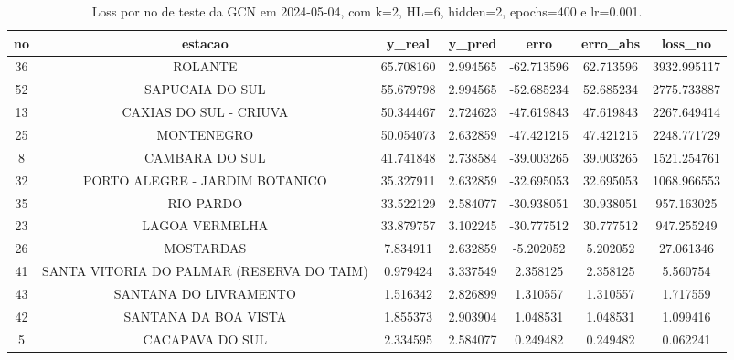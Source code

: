 \begin{table}[h]
\centering
\caption{Loss por no de teste da GCN em 2024-05-04, com k=2, HL=6, hidden=2, epochs=400 e lr=0.001.}
\label{tab:gcn_loss_k2_hl6_h2_e400_d20240504}
\begin{tabular}{ccccccc}
\toprule
no & estacao & y\_real & y\_pred & erro & erro\_abs & loss\_no \\
\midrule
36 & ROLANTE & 65.708160 & 2.994565 & -62.713596 & 62.713596 & 3932.995117 \\
52 & SAPUCAIA DO SUL & 55.679798 & 2.994565 & -52.685234 & 52.685234 & 2775.733887 \\
13 & CAXIAS DO SUL - CRIUVA & 50.344467 & 2.724623 & -47.619843 & 47.619843 & 2267.649414 \\
25 & MONTENEGRO & 50.054073 & 2.632859 & -47.421215 & 47.421215 & 2248.771729 \\
8 & CAMBARA DO SUL & 41.741848 & 2.738584 & -39.003265 & 39.003265 & 1521.254761 \\
32 & PORTO ALEGRE - JARDIM BOTANICO & 35.327911 & 2.632859 & -32.695053 & 32.695053 & 1068.966553 \\
35 & RIO PARDO & 33.522129 & 2.584077 & -30.938051 & 30.938051 & 957.163025 \\
23 & LAGOA VERMELHA & 33.879757 & 3.102245 & -30.777512 & 30.777512 & 947.255249 \\
26 & MOSTARDAS & 7.834911 & 2.632859 & -5.202052 & 5.202052 & 27.061346 \\
41 & SANTA VITORIA DO PALMAR (RESERVA DO TAIM) & 0.979424 & 3.337549 & 2.358125 & 2.358125 & 5.560754 \\
43 & SANTANA DO LIVRAMENTO & 1.516342 & 2.826899 & 1.310557 & 1.310557 & 1.717559 \\
42 & SANTANA DA BOA VISTA & 1.855373 & 2.903904 & 1.048531 & 1.048531 & 1.099416 \\
5 & CACAPAVA DO SUL & 2.334595 & 2.584077 & 0.249482 & 0.249482 & 0.062241 \\
\bottomrule
\end{tabular}
\end{table}
